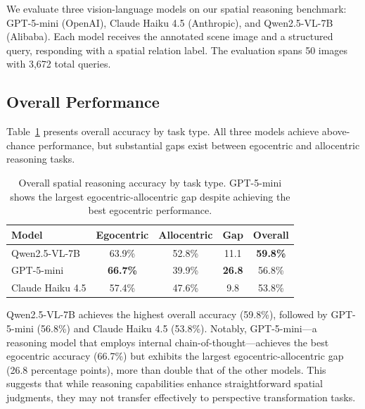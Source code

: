 
We evaluate three vision-language models on our spatial reasoning benchmark: GPT-5-mini (OpenAI), Claude Haiku 4.5 (Anthropic), and Qwen2.5-VL-7B (Alibaba). Each model receives the annotated scene image and a structured query, responding with a spatial relation label. The evaluation spans 50 images with 3,672 total queries.

\subsection{Overall Performance}

Table~\ref{tab:overall_results} presents overall accuracy by task type. All three models achieve above-chance performance, but substantial gaps exist between egocentric and allocentric reasoning tasks.

\begin{table}[h]
\centering
\caption{Overall spatial reasoning accuracy by task type. GPT-5-mini shows the largest egocentric-allocentric gap despite achieving the best egocentric performance.}
\label{tab:overall_results}
\begin{tabular}{@{}lccc|c@{}}
\toprule
\textbf{Model} & \textbf{Egocentric} & \textbf{Allocentric} & \textbf{Gap} & \textbf{Overall} \\
\midrule
Qwen2.5-VL-7B & 63.9\% & 52.8\% & 11.1 & \textbf{59.8\%} \\
GPT-5-mini & \textbf{66.7\%} & 39.9\% & \textbf{26.8} & 56.8\% \\
Claude Haiku 4.5 & 57.4\% & 47.6\% & 9.8 & 53.8\% \\
\bottomrule
\end{tabular}
\end{table}

Qwen2.5-VL-7B achieves the highest overall accuracy (59.8\%), followed by GPT-5-mini (56.8\%) and Claude Haiku 4.5 (53.8\%). Notably, GPT-5-mini---a reasoning model that employs internal chain-of-thought---achieves the best egocentric accuracy (66.7\%) but exhibits the largest egocentric-allocentric gap (26.8 percentage points), more than double that of the other models. This suggests that while reasoning capabilities enhance straightforward spatial judgments, they may not transfer effectively to perspective transformation tasks.

